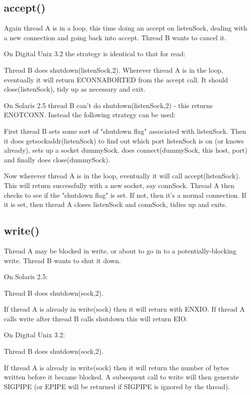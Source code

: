 \documentclass[11pt]{article}
\begin{document}
\subsection{accept()}

Again thread A is in a loop, this time doing an accept on listenSock, dealing
with a new connection and going back into accept.  Thread B wants to cancel it.

On Digital Unix 3.2 the strategy is identical to that for read:

Thread B does shutdown(listenSock,2).  Wherever thread A is in the loop,
eventually it will return ECONNABORTED from the accept call.  It should
close(listenSock), tidy up as necessary and exit.

On Solaris 2.5 thread B can't do shutdown(listenSock,2) - this returns
ENOTCONN.  Instead the following strategy can be used:

First thread B sets some sort of "shutdown flag" associated with listenSock.
Then it does getsockaddr(listenSock) to find out which port listenSock is on
(or knows already), sets up a socket dummySock, does connect(dummySock, this
host, port) and finally does close(dummySock).

Now wherever thread A is in the loop, eventually it will call
accept(listenSock).  This will return successfully with a new socket, say
connSock.  Thread A then checks to see if the "shutdown flag" is set.  If not,
then it's a normal connection.  If it is set, then thread A closes listenSock
and connSock, tidies up and exits.


\subsection{write()}

Thread A may be blocked in write, or about to go in to a potentially-blocking
write.  Thread B wants to shut it down.

On Solaris 2.5:

Thread B does shutdown(sock,2).

If thread A is already in write(sock) then it will return with ENXIO.  If
thread A calls write after thread B calls shutdown this will return EIO.


On Digital Unix 3.2:

Thread B does shutdown(sock,2).

If thread A is already in write(sock) then it will return the number of bytes
written before it became blocked.  A subsequent call to write will then
generate SIGPIPE (or EPIPE will be returned if SIGPIPE is ignored by the
thread).
\end{document}
